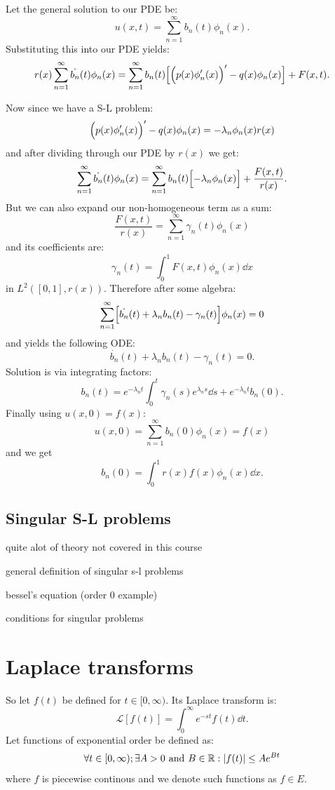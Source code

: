 \documentclass{article}
\begin{document}
Let the general solution to our PDE be:
$$u(x,t)=\sum_{n=1}^{\infty}b_n(t)\phi_n(x).$$
Substituting this into our PDE yields:
$$r(x)\sum_{n=1}^{\infty}\dot{b_n}(t)\phi_n(x)
=\sum_{n=1}^{\infty}b_n(t)\Bigl[\Bigl(p(x)
\phi'_n(x)\Bigr)'-q(x)\phi_n(x)\Bigr]+F(x,t).$$

\newpage

Now since we have a S-L problem:
$$\Bigl(p(x)\phi'_n(x)\Bigr)'-q(x)\phi_n(x)
=-\lambda_n\phi_n(x)r(x)$$
and after dividing through our PDE by $r(x)$ we get:
$$\sum_{n=1}^{\infty}\dot{b_n}(t)\phi_n(x)
=\sum_{n=1}^{\infty}b_n(t)\Bigl[-\lambda_n\phi_n(x)\Bigr]
+\frac{F(x,t)}{r(x)}.$$
But we can also expand our non-homogeneous term as a sum:
$$\frac{F(x,t)}{r(x)}=\sum_{n=1}^{\infty}\gamma_n(t)\phi_n(x)$$
and its coefficients are:
$$\gamma_n(t)=\int_{0}^{1}F(x,t)\phi_n(x)\dd x$$
in $L^2([0,1],r(x))$. Therefore after some algebra:
$$\sum_{n=1}^{\infty}\Bigl[\dot{b_n}(t)
+\lambda_n b_n(t)-\gamma_n(t)\Bigr]\phi_n(x)=0$$
and yields the following ODE:
$$\dot{b_n}(t)
+\lambda_n b_n(t)-\gamma_n(t)=0.$$
Solution is via integrating factors:
$$b_n(t)=e^{-\lambda_n t}
\int_{0}^{t}\gamma_n(s)e^{\lambda_n s}\dd s
+e^{-\lambda_n t}b_n(0).$$
Finally using $u(x,0)=f(x)$:
$$u(x,0)=\sum_{n=1}^{\infty}b_n(0)\phi_n(x)
=f(x)$$
and we get
$$b_n(0)=\int_{0}^{1}r(x)f(x)\phi_n(x)\dd x.$$
\newpage

\subsection{Singular S-L problems}
quite alot of theory not covered in this course

general definition of singular s-l problems

bessel's equation (order 0 example)

conditions for singular problems

\newpage

\section{Laplace transforms}
So let $f(t)$ be defined for $t\in[0,\infty)$. Its Laplace transform is:
$$\mathcal{L}[f(t)]=\int_{0}^{\infty}e^{-st}f(t)\dd t.$$
Let functions of exponential order be defined as:
$$\forall t\in[0,\infty);\exists A>0\hspace{0.05in}\text{and}\hspace{0.05in}
B\in\mathbb{R}:|f(t)|\leq Ae^{Bt}$$
where $f$ is piecewise continous and
we denote such functions as $f\in E$.
\end{document}
